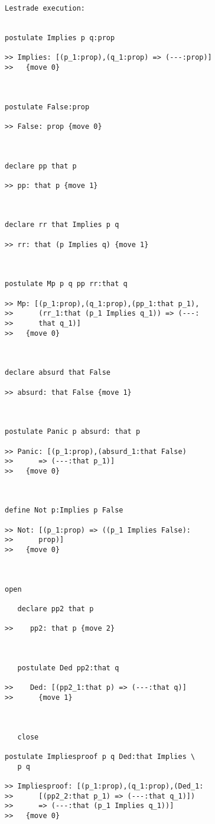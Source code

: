 \documentclass[12pt]{article}
\begin{document}
\begin{verbatim}Lestrade execution:


postulate Implies p q:prop

>> Implies: [(p_1:prop),(q_1:prop) => (---:prop)]
>>   {move 0}



postulate False:prop

>> False: prop {move 0}



declare pp that p

>> pp: that p {move 1}



declare rr that Implies p q

>> rr: that (p Implies q) {move 1}



postulate Mp p q pp rr:that q

>> Mp: [(p_1:prop),(q_1:prop),(pp_1:that p_1),
>>      (rr_1:that (p_1 Implies q_1)) => (---:
>>      that q_1)]
>>   {move 0}



declare absurd that False

>> absurd: that False {move 1}



postulate Panic p absurd: that p

>> Panic: [(p_1:prop),(absurd_1:that False)
>>      => (---:that p_1)]
>>   {move 0}



define Not p:Implies p False

>> Not: [(p_1:prop) => ((p_1 Implies False):
>>      prop)]
>>   {move 0}



open

   declare pp2 that p

>>    pp2: that p {move 2}



   postulate Ded pp2:that q

>>    Ded: [(pp2_1:that p) => (---:that q)]
>>      {move 1}



   close

postulate Impliesproof p q Ded:that Implies \
   p q

>> Impliesproof: [(p_1:prop),(q_1:prop),(Ded_1:
>>      [(pp2_2:that p_1) => (---:that q_1)])
>>      => (---:that (p_1 Implies q_1))]
>>   {move 0}


\end{verbatim}
\end{document}
